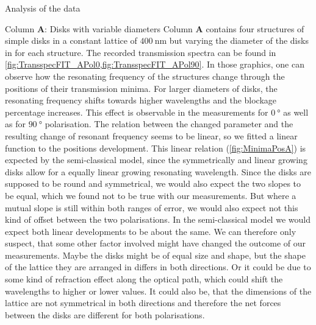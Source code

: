 \documentclass[pdftex, a4paper,11pt, twoside, UKenglish]{report}
\begin{document}
\begin{chapter}{Analysis of the data}
    \begin{section}{Column \textbf{A}: Disks with variable diameters}
      \label{chp:DataA}
      Column \textbf{A} contains four structures of simple disks in a constant
      lattice of $\SI{400}{\nano\meter}$ but varying the diameter of the disks
      in for each structure. The recorded transmission spectra can be found in
      \cref{fig:TransspecFIT_APol0,fig:TransspecFIT_APol90}.
      In those graphics, one can observe how the resonating frequency of the
      structures change through the positions of their transmission minima.
      For larger diameters of disks, the resonating frequency shifts towards
      higher wavelengths and the blockage percentage increases.
      This effect is observable in the measurements for $\SI{0}{\degree}$ as
      well as for $\SI{90}{\degree}$ polarisation. The relation between the
      changed parameter and the resulting change of resonant frequency seems to
      be linear, so we fitted a linear function to the positions development.
      This linear relation (\cref{fig:MinimaPosA}) is expected by the
      semi-classical model, since the symmetrically and linear growing disks
      allow for a equally linear growing resonating wavelength. Since the
      disks are supposed to be round and symmetrical, we would also expect the
      two slopes to be equal, which we found not to be true with our
      measurements. But where a mutual slope is still within both ranges of
      error, we would also expect not this kind of offset between the two
      polarisations. In the semi-classical model we would expect both linear
      developments to be about the same. We can therefore only suspect, that
      some other factor involved might have changed the outcome of our
      measurements. Maybe the disks might be of equal size and shape, but the
      shape of the lattice they are arranged in differs in both directions.
      Or it could be due to some kind of refraction effect along the optical
      path, which could shift the wavelengths to higher or lower values.
      It could also be, that the dimensions of the lattice are not symmetrical
      in both directions and therefore the net forces between the disks are
      different for both polarisations.
      

\end{section}
\end{chapter}
\end{document}
